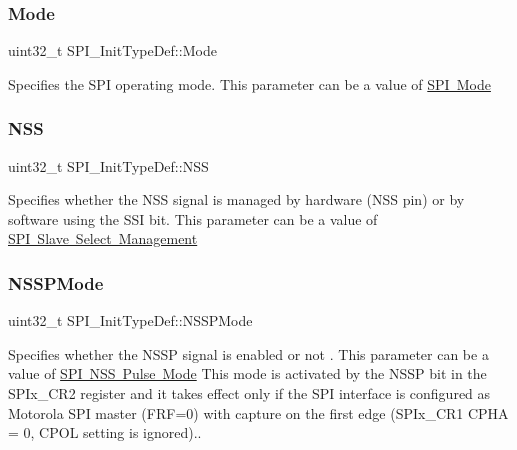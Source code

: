 \subsubsection{\texorpdfstring{Mode}{Mode}}
{\footnotesize\ttfamily uint32\+\_\+t S\+P\+I\+\_\+\+Init\+Type\+Def\+::\+Mode}

Specifies the S\+PI operating mode. This parameter can be a value of \mbox{\hyperlink{group___s_p_i___mode}{S\+PI Mode}} \mbox{\label{struct_s_p_i___init_type_def_aed541d17808213ac6f90ac7deb2bec5f}} 
\subsubsection{\texorpdfstring{NSS}{NSS}}
{\footnotesize\ttfamily uint32\+\_\+t S\+P\+I\+\_\+\+Init\+Type\+Def\+::\+N\+SS}

Specifies whether the N\+SS signal is managed by hardware (N\+SS pin) or by software using the S\+SI bit. This parameter can be a value of \mbox{\hyperlink{group___s_p_i___slave___select__management}{S\+PI Slave Select Management}} \mbox{\label{struct_s_p_i___init_type_def_aab94c82883ea08f33ef383efe30347eb}} 
\subsubsection{\texorpdfstring{NSSPMode}{NSSPMode}}
{\footnotesize\ttfamily uint32\+\_\+t S\+P\+I\+\_\+\+Init\+Type\+Def\+::\+N\+S\+S\+P\+Mode}

Specifies whether the N\+S\+SP signal is enabled or not . This parameter can be a value of \mbox{\hyperlink{group___s_p_i___n_s_s_p___mode}{S\+PI N\+SS Pulse Mode}} This mode is activated by the N\+S\+SP bit in the S\+P\+Ix\+\_\+\+C\+R2 register and it takes effect only if the S\+PI interface is configured as Motorola S\+PI master (F\+RF=0) with capture on the first edge (S\+P\+Ix\+\_\+\+C\+R1 C\+P\+HA = 0, C\+P\+OL setting is ignored).. \mbox{\label{struct_s_p_i___init_type_def_a60db7e87bb66775df6213e4006dfd876}} 
